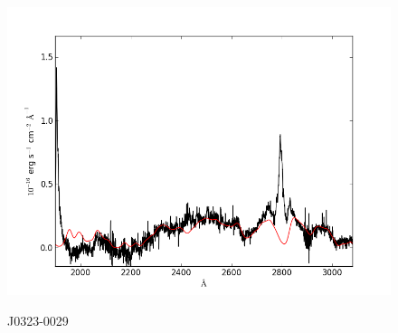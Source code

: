 \documentclass[usenatbib]{mn2e}
\begin{document}
\begin{figure}
\begin{center}
\vspace{5mm}
\includegraphics[width=0.49\linewidth,angle=0]{./red/fe_fit_SBB_10.png}\\

\end{center} 
\caption{J0323-0029 \label{fig:landscape}}   
\end{figure}

\newpage
\end{document}
